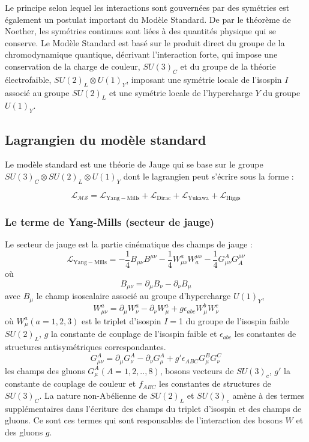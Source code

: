 Le principe selon lequel les interactions sont gouvernées par des symétries est également un postulat important du Modèle Standard. De par le théorème de Noether, les symétries continues sont liées à des quantités physique qui se conserve. Le Modèle Standard est basé sur le produit direct du groupe de la chromodynamique quantique, décrivant l'interaction forte, qui impose une conservation de la charge de couleur, $SU(3)_{C}$ et du groupe de la théorie électrofaible, $SU(2)_{L} \otimes U(1)_{Y}$, imposant une symétrie locale de l'isospin $I$ associé au groupe $SU(2)_{L}$ et une symétrie locale de l'hypercharge $Y$ du groupe $U(1)_{Y}$.

\subsection{Lagrangien du modèle standard}
Le modèle standard est une théorie de Jauge qui se base sur le groupe $SU(3)_{C} \otimes SU(2)_{L} \otimes U(1)_{Y}$ dont le lagrangien peut s'écrire sous la forme :

\begin{equation}
\mathcal{L_{MS}}=\mathcal{L}_{\mathrm{Yang-Mills}}+\mathcal{L}_{\mathrm{Dirac}}+\mathcal{L}_{\mathrm{Yukawa}}+\mathcal{L}_{\mathrm{Higgs}}
\end{equation}

\subsubsection{Le terme de Yang-Mills (secteur de jauge)}
Le secteur de jauge est la partie cinématique des champs de jauge :
\begin{equation}
\mathcal{L}_{\mathrm{Yang-Mills}}=-\frac{1}{4}B_{\mu\nu}B^{\mu\nu}-\frac{1}{4}W_{\mu\nu}^{a}W_{a}^{\mu\nu}-\frac{1}{4}G_{\mu\nu}^{A}G_{A}^{\mu\nu}
\end{equation}
où 
\begin{equation}
B_{\mu\nu}=\partial_{\mu}B_{\nu}-\partial_{\nu}B_{\mu}
\end{equation}
avec $B_{\mu}$ le champ isoscalaire associé au groupe d'hypercharge $U(1)_{Y}$,
\begin{equation}
W_{\mu\nu}^{a}=\partial_{\mu}W_{\nu}^{a}-\partial_{\nu}W_{\mu}^{a}+g\epsilon_{abc}W_{\mu}^{b}W_{\nu}^{c}
\end{equation}
où $W_{\mu}^{a} (a=1,2,3)$ est le triplet d'isospin $I=$\num{1} du groupe de l'isospin faible $SU(2)_{L}$, $g$ la constante de couplage de l'isospin faible et $\epsilon_{abc}$ les constantes de structures antisymétriques correspondantes.  
\begin{equation}
G_{\mu\nu}^{A}=\partial_{\mu}G_{\nu}^{A}-\partial_{\nu}G_{\mu}^{A}+g'\epsilon_{ABC}G_{\mu}^{B}G_{\nu}^{C}
\end{equation}
les champs des gluons $G_{\mu}^{A} (A=1,2,..,8)$, bosons vecteurs de $SU(3)_{c}$, $g'$ la constante de couplage de couleur et $f_{ABC}$ les constantes de structures de $SU(3)_{C}$.
La nature non-Abélienne de $SU(2)_{L}$ et $SU(3)_{c}$ amène à des termes supplémentaires dans l'écriture des champs du triplet d'isospin et des champs de gluons. Ce sont ces termes qui sont responsables de l'interaction des bosons $W$ et des gluons $g$.

